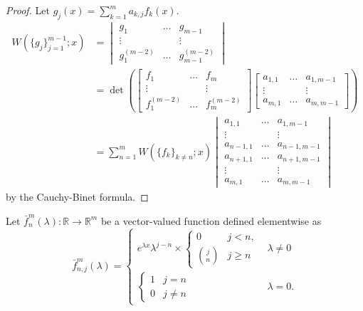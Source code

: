 \documentclass{book}
\begin{document}
\begin{proof}
Let $g_j(x) = \sum_{k=1}^m a_{k,j} f_k(x)$.
\begin{align*}
W(\{g_j\}_{j=1}^{m-1} ; x) & = \begin{vmatrix}
g_1 & \dots & g_{m-1} \\
\vdots & & \vdots \\
g_1^{(m-2)} & \dots & g_{m-1}^{(m-2)} \end{vmatrix} \\
& = \det \left ( \begin{bmatrix} f_1 & \dots & f_m \\ \vdots & & \vdots \\ f_1^{(m-2)} & \dots & f_m^{(m-2)} \end{bmatrix} \begin{bmatrix} a_{1,1} & \dots & a_{1,m-1} \\ \vdots & & \vdots \\ a_{m,1} & \dots & a_{m,m-1} \end{bmatrix} \right ) \\
& = \sum_{n=1}^{m} W(\{f_k\}_{k\neq n} ; x) \begin{vmatrix}
a_{1,1} & \dots & a_{1,m-1} \\
\vdots & & \vdots \\
a_{n-1,1} & \dots & a_{n-1,m-1} \\
a_{n+1,1} & \dots & a_{n+1,m-1} \\
\vdots & & \vdots \\
a_{m,1} & \dots & a_{m,m-1}
\end{vmatrix}
\end{align*}
by the Cauchy-Binet formula.
\end{proof}

\newcommand{\fmn}[2]{\bar{f}^{#2}_{#1}}

\begin{defn}
Let $\fmn{n}{m}(\lambda):\mathbb{R} \rightarrow \mathbb{R}^m$ be a vector-valued function defined elementwise as
\begin{equation*}
\fmn{n,j}{m}(\lambda) = \begin{cases} e^{\lambda x} \lambda^{j-n} \times \begin{cases} 0 & j< n, \\ \binom{j}{n} & j \geq n \end{cases} & \lambda \neq 0 \\
\begin{cases} 1 & j = n \\ 0 & j \neq n \end{cases} & \lambda = 0. \end{cases}
\end{equation*}
\end{defn}
\end{document}
